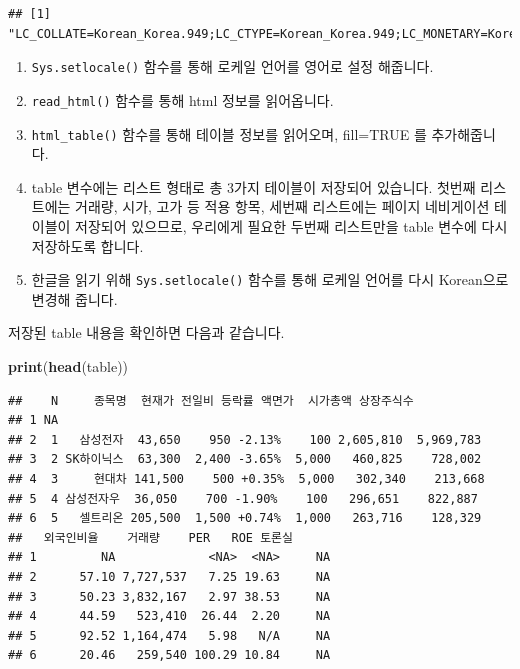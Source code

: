 \documentclass[]{book}
\newenvironment{Shaded}{\begin{snugshade}}{\end{snugshade}}
\newcommand{\KeywordTok}[1]{\textcolor[rgb]{0.13,0.29,0.53}{\textbf{#1}}}
\newcommand{\NormalTok}[1]{#1}
\providecommand{\tightlist}{%
  \setlength{\itemsep}{0pt}\setlength{\parskip}{0pt}}
\begin{document}
\begin{verbatim}
## [1] "LC_COLLATE=Korean_Korea.949;LC_CTYPE=Korean_Korea.949;LC_MONETARY=Korean_Korea.949;LC_NUMERIC=C;LC_TIME=Korean_Korea.949"
\end{verbatim}

\begin{enumerate}
\def\labelenumi{\arabic{enumi}.}
\tightlist
\item
  \texttt{Sys.setlocale()} 함수를 통해 로케일 언어를 영어로 설정 해줍니다.
\item
  \texttt{read\_html()} 함수를 통해 html 정보를 읽어옵니다.
\item
  \texttt{html\_table()} 함수를 통해 테이블 정보를 읽어오며, fill=TRUE 를 추가해줍니다.
\item
  table 변수에는 리스트 형태로 총 3가지 테이블이 저장되어 있습니다. 첫번째 리스트에는 거래량, 시가, 고가 등 적용 항목, 세번째 리스트에는 페이지 네비게이션 테이블이 저장되어 있으므로, 우리에게 필요한 두번째 리스트만을 table 변수에 다시 저장하도록 합니다.
\item
  한글을 읽기 위해 \texttt{Sys.setlocale()} 함수를 통해 로케일 언어를 다시 Korean으로 변경해 줍니다.
\end{enumerate}

저장된 table 내용을 확인하면 다음과 같습니다.

\begin{Shaded}
\begin{Highlighting}[]
\KeywordTok{print}\NormalTok{(}\KeywordTok{head}\NormalTok{(table))}
\end{Highlighting}
\end{Shaded}

\begin{verbatim}
##    N     종목명  현재가 전일비 등락률 액면가  시가총액 상장주식수
## 1 NA                                                             
## 2  1   삼성전자  43,650    950 -2.13%    100 2,605,810  5,969,783
## 3  2 SK하이닉스  63,300  2,400 -3.65%  5,000   460,825    728,002
## 4  3     현대차 141,500    500 +0.35%  5,000   302,340    213,668
## 5  4 삼성전자우  36,050    700 -1.90%    100   296,651    822,887
## 6  5   셀트리온 205,500  1,500 +0.74%  1,000   263,716    128,329
##   외국인비율    거래량    PER   ROE 토론실
## 1         NA             <NA>  <NA>     NA
## 2      57.10 7,727,537   7.25 19.63     NA
## 3      50.23 3,832,167   2.97 38.53     NA
## 4      44.59   523,410  26.44  2.20     NA
## 5      92.52 1,164,474   5.98   N/A     NA
## 6      20.46   259,540 100.29 10.84     NA
\end{verbatim}
\end{document}
